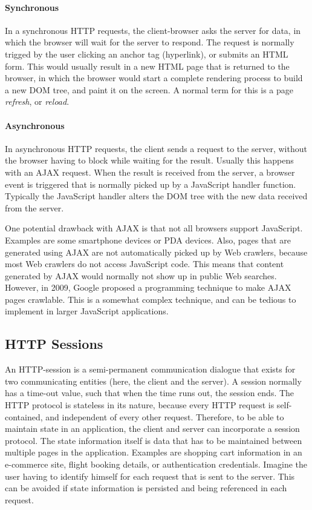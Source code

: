 \paragraph{Synchronous}
In a synchronous HTTP requests, the client-browser asks the server for data, in which the browser will wait for the server to respond. The request is normally trigged by the user clicking an anchor tag (hyperlink), or submits an HTML form. This would usually result in a new HTML page that is returned to the browser, in which the browser would  start a complete rendering process to build a new DOM tree, and paint it on the screen. A normal term for this is a page \textit{refresh}, or \textit{reload}.

\paragraph{Asynchronous}
In asynchronous HTTP requests, the client sends a request to the server, without the browser having to block while waiting for the result. Usually this happens with an AJAX request. When the result is received from the server, a browser event is triggered that is normally picked up by a JavaScript handler function. Typically the JavaScript handler alters the DOM tree with the new data received from the server.

One potential drawback with AJAX is that not all browsers support JavaScript. Examples are some smartphone devices or PDA devices.  Also, pages that are generated using AJAX are not automatically picked up by Web crawlers, because most Web crawlers do not access JavaScript code. This means that content generated by AJAX would normally not show up in public Web searches. However, in 2009, Google proposed a programming technique to make AJAX pages crawlable\cite{ajaxcrawl}. This is a somewhat complex technique, and can be tedious to implement in larger JavaScript applications.


\subsection{HTTP Sessions}
An HTTP-session is a semi-permanent communication dialogue that exists for two communicating entities (here, the client and the server). A session normally has a time-out value, such that when the time runs out, the session ends. The HTTP protocol is stateless in its nature, because every HTTP request is self-contained, and independent of every other request. Therefore, to be able to maintain state in an application, the client and server can incorporate a session protocol. The state information itself is data that has to be maintained between multiple pages in the application. Examples are shopping cart information in an e-commerce site, flight booking details, or authentication credentials. Imagine the user having to identify himself for each request that is sent to the server. This can be avoided if state information is persisted and being referenced in each request. 

